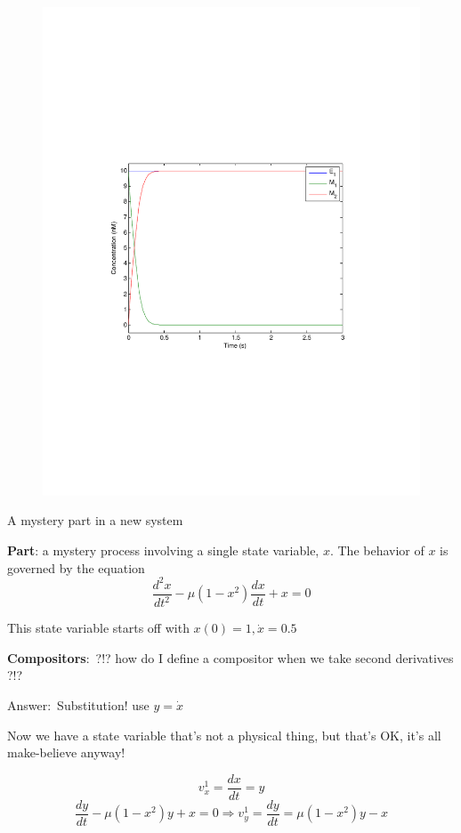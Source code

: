 \documentclass[handout]{beamer} %
\newcommand{\br}{\vspace{\baselineskip}}
\begin{document}
\begin{frame}{}

\begin{figure}[htp]
    \includegraphics[scale=0.65, clip=true, trim=3.5cm 8cm 3.5cm 8cm]{sys1.pdf}
\end{figure}

\end{frame}

\begin{frame}{A mystery part in a new system}

\textbf{Part}: a mystery process involving a single state variable, $x$. The behavior of $x$ is governed by the equation
$$ \frac{d^2x}{dt^2} - \mu (1 - x^2)\frac{dx}{dt} + x = 0 $$

This state variable starts off with $x(0) = 1, \dot x = 0.5$

\pause
\br

\textbf{Compositors}:\pause ~?!? how do I define a compositor when we take second derivatives ?!?\pause

Answer:\pause ~Substitution! use $y = \dot x$\pause

Now we have a state variable that's not a physical thing, but that's OK, it's all make-believe anyway!\pause

$$v_{x}^1 = \frac{dx}{dt} = y$$
$$\frac{dy}{dt} - \mu (1 - x^2)y + x = 0 \Rightarrow v_{y}^1 = \frac{dy}{dt} = \mu (1 - x^2)y - x $$

\end{frame}
\end{document}
